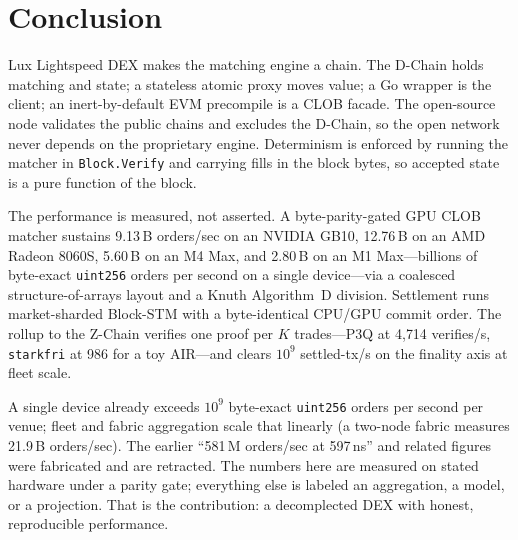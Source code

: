 \section{Conclusion}
\label{sec:conclusion}

Lux Lightspeed DEX makes the matching engine a chain. The D-Chain holds matching and state;
a stateless atomic proxy moves value; a Go wrapper is the client; an inert-by-default EVM
precompile is a CLOB facade. The open-source node validates the public chains and excludes
the D-Chain, so the open network never depends on the proprietary engine. Determinism is
enforced by running the matcher in \texttt{Block.Verify} and carrying fills in the block
bytes, so accepted state is a pure function of the block.

The performance is measured, not asserted. A byte-parity-gated GPU CLOB matcher sustains
9.13\,B orders/sec on an NVIDIA GB10, 12.76\,B on an AMD Radeon 8060S, 5.60\,B on an M4 Max,
and 2.80\,B on an M1 Max---billions of byte-exact \texttt{uint256} orders per second on a
single device---via a coalesced structure-of-arrays layout and a Knuth Algorithm~D division.
Settlement runs market-sharded Block-STM with a byte-identical CPU/GPU commit order. The
rollup to the Z-Chain verifies one proof per $K$ trades---P3Q at 4{,}714 verifies/s,
\texttt{starkfri} at 986 for a toy AIR---and clears $10^{9}$ settled-tx/s on the finality
axis at fleet scale.

A single device already exceeds $10^{9}$ byte-exact \texttt{uint256} orders per second per
venue; fleet and fabric aggregation scale that linearly (a two-node fabric measures
21.9\,B orders/sec). The earlier ``581\,M orders/sec at 597\,ns'' and related figures were
fabricated and are retracted. The numbers here are measured on stated hardware under a parity
gate; everything else is labeled an aggregation, a model, or a projection. That is the
contribution: a decomplected DEX with honest, reproducible performance.
